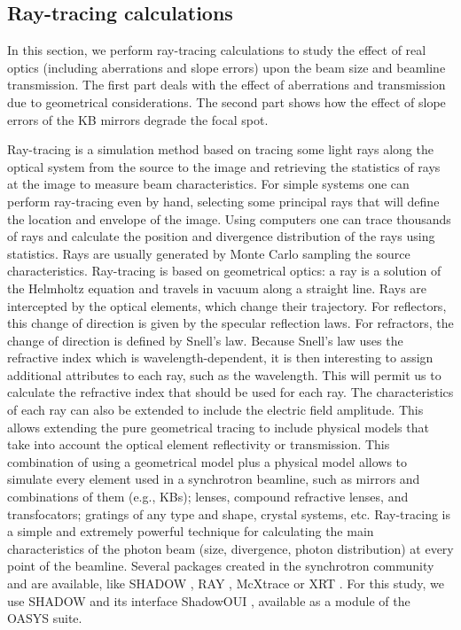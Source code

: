 \documentclass{iucr}              %
\begin{document}
% 
\subsection{Ray-tracing calculations}
\label{level1}
In this section, we perform ray-tracing calculations to study the effect of real optics (including aberrations and slope errors) upon the beam size and beamline transmission. The first part deals with the effect of aberrations and transmission due to geometrical considerations. The second part shows how the effect of slope errors of the KB mirrors degrade the focal spot.  

Ray-tracing is a simulation method based on tracing some light rays along the optical system from the source to the image and retrieving the statistics of rays at the image to measure beam characteristics. For simple systems one can perform ray-tracing even by hand, selecting some principal rays that will define the location and envelope of the image. Using computers one can trace thousands of rays and calculate the position and divergence distribution of the rays using statistics. Rays are usually generated by Monte Carlo sampling the source characteristics. Ray-tracing is based on geometrical optics: a ray is a solution of the Helmholtz equation and travels in vacuum along a straight line. Rays are intercepted by the optical elements, which change their trajectory. For reflectors, this change of direction is given by the specular reflection laws. For refractors, the change of direction is defined by  Snell's law. Because Snell's law uses the refractive index which is wavelength-dependent, it is then interesting to assign additional attributes to each ray, such as the wavelength. This will permit us to calculate the refractive index that should be used for each ray. The characteristics of each ray can also be extended to include the electric field amplitude. This allows extending the pure geometrical tracing to include physical models that take into account the optical element reflectivity or transmission. This combination of using a geometrical model plus a physical model allows to simulate every element used in a synchrotron beamline, such as mirrors and combinations of them (e.g., KBs); lenses, compound refractive lenses, and transfocators; gratings of any type and shape, crystal systems, etc. Ray-tracing is a simple and extremely powerful technique for calculating the main characteristics of the photon beam (size, divergence, photon distribution) at every point of the beamline. 
Several packages created in the synchrotron community and are available, like SHADOW \cite{codeSHADOW}, RAY \cite{codeRAY}, McXtrace \cite{codeMCXTRACE} or XRT \cite{codeXRT}. For this study, we use SHADOW and its interface ShadowOUI \cite{codeSHADOWOUI}, available as a module of the OASYS suite.
\end{document}
